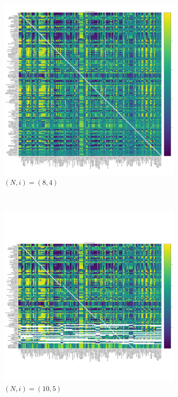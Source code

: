 \documentclass{article}
\begin{document}
\begin{figure}[!hbtp]
    \begin{subfigure}[t]{.3\textwidth}
        \centering
        \includegraphics[width=.8\textwidth]{../img/fixation_heatmap_8_4_noise.pdf}
        \caption{\((N,i)=(8, 4)\)}
    \end{subfigure}%
    ~
    \begin{subfigure}[t]{.3\textwidth}
        \centering
        \includegraphics[width=.8\textwidth]{../img/fixation_heatmap_10_5_noise.pdf}
        \caption{\((N,i)=(10, 5)\)}
    \end{subfigure}%
    ~
    \begin{subfigure}[t]{.3\textwidth}

\end{subfigure}
\end{figure}
\end{document}
